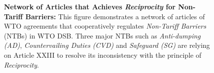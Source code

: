 \begin{figure}[h]
    \centering{
        
    }
    \caption{{\bf Network of Articles that Achieves \textit{Reciprocity} for Non-Tariff Barriers:}
    This figure demonstrates a network of articles of WTO agreements
    that cooperatively regulates \textit{Non-Tariff Barriers} (NTBs) in WTO DSB.
    Three major NTBs such as \textit{Anti-dumping (AD)}, \textit{Countervailing Duties (CVD)}
    and \textit{Safeguard (SG)} are relying on Article XXIII to resolve its inconsistency with the principle of \textit{Reciprocity}.
}
    \label{fig:ntb-explained}
\end{figure}